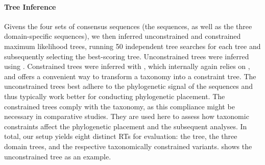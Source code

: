 \paragraph{Tree Inference}
\label{ch:AutomaticTrees:sec:Evaluation:sub:ReferenceTreeSetup:par:TreeInference}

Givens the four sets of consensus sequences
(the  sequences, as well as the three domain-specific sequences),
we then inferred unconstrained and constrained maximum likelihood trees,
running 50 independent tree searches for each tree and subsequently selecting the best-scoring tree.
Unconstrained trees were inferred using  \citep{Stamatakis2014}.
Constrained trees were inferred with  \citep{Kozlov2016},
which internally again relies on ,
and offers a convenient way to transform a taxonomy into a constraint tree.
The unconstrained trees best adhere to the phylogenetic signal of the sequences
and thus typically work better for conducting phylogenetic placement.
The constrained trees comply with the  taxonomy,
as this compliance might be necessary in comparative studies.
They are used here to assess how taxonomic constraints affect the phylogenetic placement and the subsequent analyses.
In total, our setup yields eight distinct \acp{RT} for evaluation:
the  tree, the three domain trees, and the respective taxonomically constrained variants.
 shows the unconstrained  tree as an example.

